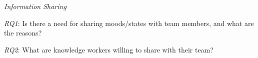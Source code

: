 



\bigskip\noindent\textit{Information Sharing}

\smallskip\noindent\textit{RQ1}: Is there a need for sharing moods/states with team members, and what are the reasons?

\smallskip\noindent\textit{RQ2}: What are knowledge workers willing to share with their team?

